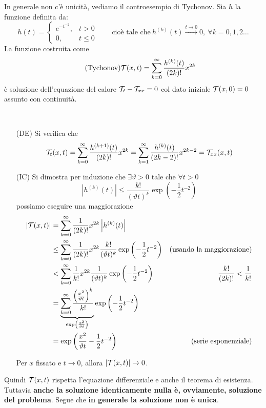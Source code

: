 \documentclass[10pt,a4paper,twoside,openright]{book}
\begin{document}
In generale non c'è unicità, vediamo il controesempio di Tychonov. Sia $h$ la funzione definita da:
\begin{equation*}
h(t) =
\begin{cases}
e^{-t^{-2}}, & t >0\\
0, & t\leqslant 0
\end{cases} \qquad \text{cioè tale che} \ h^{(k)}(t)\xrightarrow{t\rightarrow 0} 0,\ \forall k=0,1,2\dotsc 
\end{equation*}
La funzione costruita come
\begin{equation}
\tag{Tychonov}
\mathcal{T} (x,t) =\sum\limits ^{\infty }_{k=0}\frac{h^{(k)}(t)}{(2k) !} x^{2k}
\end{equation}
è soluzione dell'equazione del calore $\mathcal{T} _{t} -\mathcal{T} _{xx} =0$ col dato iniziale $\mathcal{T} (x,0)=0$ assunto con continuità.
\begin{dimostrazione}
	\ \\
	\begin{enumerate}
	\item[(DE)] Si verifica che
	\begin{equation*}
	\mathcal{T} _{t}(x,t) =\sum\limits _{k=0}^{\infty }\frac{h^{(k+1)}(t)}{(2k) !} x^{2k} =\sum\limits _{k=1}^{\infty }\frac{h^{(k)}(t)}{(2k-2) !} x^{2k-2} =\mathcal{T} _{xx}(x,t)
	\end{equation*}
	\item[(IC)] Si dimostra per induzione che $\exists \vartheta  >0$ tale che $\forall t >0$
	\begin{equation*}
	\left| h^{(k)}(t)\right| \leqslant \frac{k!}{(\vartheta t)^{k}}\exp\left(-\frac{1}{2} t^{-2}\right)
	\end{equation*}possiamo eseguire una maggiorazione
	\begin{align*}
	| \mathcal{T} (x,t)|  & =\sum\limits _{k=0}^{\infty }\frac{1}{(2k) !} x^{2k}\left| h^{(k)}(t)\right|  & \\
	 & \leq \sum\limits _{k=0}^{\infty }\frac{1}{(2k) !} x^{2k}\frac{k!}{(\vartheta t)^{k}}\exp\left(-\frac{1}{2} t^{-2}\right) & \text{(usando la maggiorazione)}\\
	 & < \sum\limits _{k=0}^{\infty }\frac{1}{k!} x^{2k}\frac{1}{(\vartheta t)^{k}}\exp\left(-\frac{1}{2} t^{-2}\right) & \frac{k!}{(2k) !} < \frac{1}{k!}\\
	 & =\underbrace{\sum\limits _{k=0}^{\infty }\frac{\left(\frac{x^{2}}{\vartheta t}\right)^{k}}{k!}}_{\exp\left(\frac{x^{2}}{\vartheta t}\right)}\exp\left(-\frac{1}{2} t^{-2}\right) & \\
	 & =\exp\left(\frac{x^{2}}{\vartheta t} -\frac{1}{2} t^{-2}\right) & \text{(serie esponenziale)}
	\end{align*}

	Per $x$ fissato e $t\rightarrow 0$, allora $| \mathcal{T} (x,t)| \rightarrow 0$.
	\end{enumerate}
\end{dimostrazione}
Quindi $\mathcal{T} (x,t)$ rispetta l'equazione differenziale e anche il teorema di esistenza. Tuttavia \textbf{anche la soluzione identicamente nulla è, ovviamente, soluzione del problema}. Segue che \textbf{in generale la soluzione non è unica}.
\end{document}
